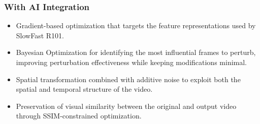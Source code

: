 \subsubsection{With AI Integration}
\begin{itemize}
    \item Gradient-based optimization that targets the 
    feature representations used by SlowFast R101.
    \item Bayesian Optimization for identifying the most 
    influential frames to perturb, improving perturbation 
    effectiveness while keeping modifications minimal.
    \item Spatial transformation combined with additive 
    noise to exploit both the spatial and temporal structure 
    of the video.
    \item Preservation of visual similarity between the 
    original and output video through SSIM-constrained 
    optimization.
\end{itemize}